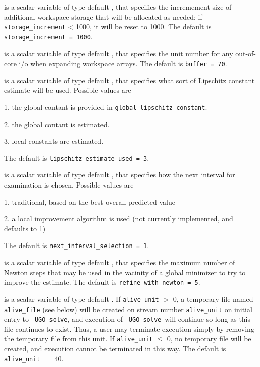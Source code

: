 \documentclass{galahad}
\newcommand{\packagename}{UGO}
\newcommand{\fullpackagename}{\libraryname\_\packagename}
\newcommand{\solver}{{\tt \fullpackagename\_solve}}
\begin{document}
\begin{description}
 is a scalar variable of type default \integer, that
specifies the incremement size of additional workspace storage that will be
allocated as needed; if {\tt storage\_increment} < 1000, it will be reset
to 1000.
The default is {\tt storage\_increment = 1000}.

 is a scalar variable of type default \integer, that specifies
the unit number for any out-of-core i/o when expanding workspace arrays.
The default is {\tt buffer = 70}.

 is a scalar variable of type default \integer,
that specifies what sort of Lipschitz constant estimate will be used.
Possible values are
\begin{description}
\item 1. the  global contant is provided in {\tt global\_lipschitz\_constant}.
\item 2. the global contant is estimated.
\item 3. local constants are estimated.
\end{description}
The default is {\tt lipschitz\_estimate\_used = 3}.

 is a scalar variable of type default \integer,
that specifies how the next interval for examination is chosen. Possible
values are
\begin{description}
\item 1. traditional, based on the best overall predicted value
\item 2. a local improvement algorithm is used (not currently implemented,
  and defaults to 1)
\end{description}
The default is {\tt next\_interval\_selection = 1}.

 is a scalar variable of type default \integer, that
specifies the maximum number of Newton steps that may be used in the
vacinity of a global  minimizer to try to improve the estimate.
The default is {\tt refine\_with\_newton = 5}.

 is a scalar variable of type default \integer.
If {\tt alive\_unit} $>$ 0, a temporary file named {\tt alive\_file} (see below)
will be created on stream number {\tt alive\_unit} on initial entry to
\solver, and execution of \solver\ will continue so
long as this file continues to exist. Thus, a user may terminate execution
simply by removing the temporary file from this unit.
If {\tt alive\_unit} $\leq$ 0, no temporary file will be created, and
execution cannot be terminated in this way.
The default is {\tt alive\_unit} $=$ 40.


\end{description}
\end{document}
